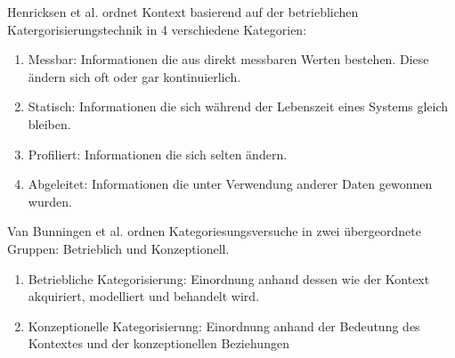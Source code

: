 Henricksen et al.\cite{henricksen2003framework} ordnet Kontext basierend auf der betrieblichen Katergorisierungstechnik in 4 verschiedene Kategorien:
\begin{enumerate}
\item {Messbar: Informationen die aus direkt messbaren Werten bestehen. Diese ändern sich oft oder gar kontinuierlich. }
\item {Statisch: Informationen die sich während der Lebenszeit eines Systems gleich bleiben.}
\item {Profiliert: Informationen die sich selten ändern.}
\item {Abgeleitet: Informationen die unter Verwendung anderer Daten gewonnen wurden. }

\end{enumerate}

Van Bunningen et al. \cite{van2005context} ordnen Kategoriesungsversuche in zwei übergeordnete Gruppen: Betrieblich und Konzeptionell. 
\begin{enumerate}
\item{Betriebliche Kategorisierung: Einordnung anhand dessen wie der Kontext akquiriert, modelliert und behandelt wird.}
\item{Konzeptionelle Kategorisierung: Einordnung anhand der Bedeutung des Kontextes und der konzeptionellen Beziehungen} %
\end{enumerate}

